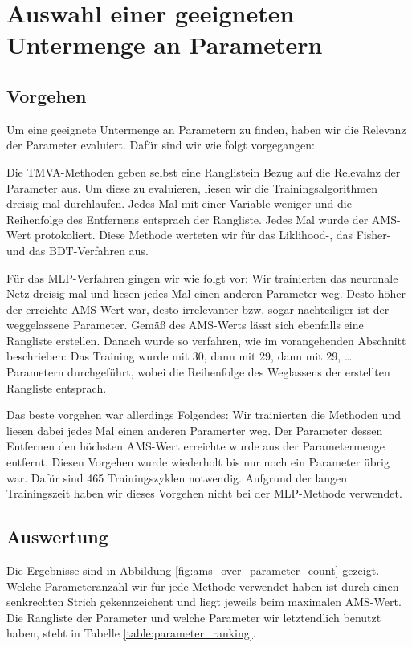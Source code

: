 \section{Auswahl einer geeigneten Untermenge an Parametern}

\subsection{Vorgehen}
Um eine geeignete Untermenge an Parametern zu finden, haben wir die Relevanz der
Parameter evaluiert. Dafür sind wir wie folgt vorgegangen:

Die TMVA-Methoden geben selbst eine Ranglistein Bezug auf die Relevalnz der
Parameter aus. Um diese zu evaluieren, liesen wir die Trainingsalgorithmen
dreisig mal durchlaufen. Jedes Mal mit einer Variable weniger und die
Reihenfolge des Entfernens entsprach der Rangliste. Jedes Mal wurde der AMS-Wert
protokoliert. Diese Methode werteten wir für das Liklihood-, das Fisher- und das
BDT-Verfahren aus.

Für das MLP-Verfahren gingen wir wie folgt vor: Wir trainierten das neuronale
Netz dreisig mal und liesen jedes Mal einen anderen Parameter weg. Desto höher
der erreichte AMS-Wert war, desto irrelevanter bzw. sogar nachteiliger ist der
weggelassene Parameter. Gemäß des AMS-Werts lässt sich ebenfalls eine Rangliste
erstellen. Danach wurde so verfahren, wie im vorangehenden Abschnitt
beschrieben: Das Training wurde mit 30, dann mit 29, dann mit 29, \ldots
Parametern durchgeführt, wobei die Reihenfolge des Weglassens der erstellten
Rangliste entsprach.

Das beste vorgehen war allerdings Folgendes: Wir trainierten die Methoden
und liesen dabei jedes Mal einen anderen Paramerter weg. Der Parameter dessen
Entfernen den höchsten AMS-Wert erreichte wurde aus der Parametermenge entfernt.
Diesen Vorgehen wurde wiederholt bis nur noch ein Parameter übrig war. Dafür
sind 465 Trainingszyklen notwendig. Aufgrund der langen Trainingszeit
haben wir dieses Vorgehen nicht bei der MLP-Methode verwendet.


\subsection{Auswertung}

Die Ergebnisse sind in Abbildung \ref{fig:ams_over_parameter_count} gezeigt.
Welche Parameteranzahl wir für jede Methode verwendet haben ist durch einen
senkrechten Strich gekennzeichent und liegt jeweils beim maximalen AMS-Wert.
Die Rangliste der Parameter und welche Parameter wir letztendlich benutzt haben,
steht in Tabelle \ref{table:parameter_ranking}.

